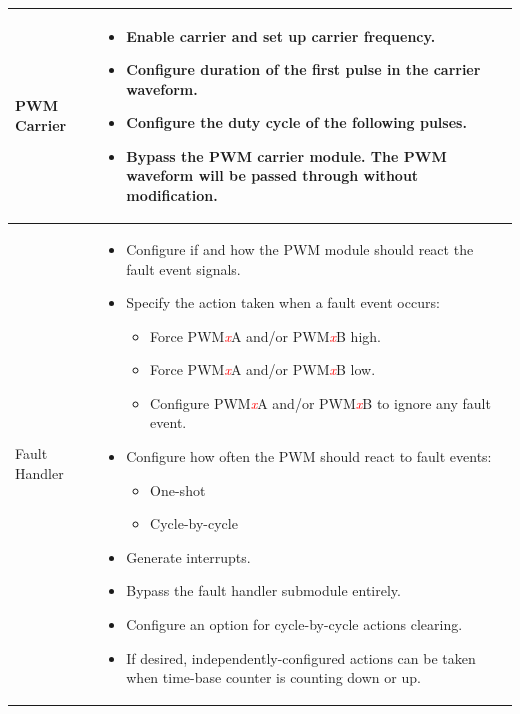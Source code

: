 \begin{longtable}[c]{|m{5cm}|m{10cm}|}
    PWM Carrier &\vspace{-1em}
    \begin{itemize}
        \item Enable carrier and set up carrier frequency.
        \item Configure duration of the first pulse in the carrier waveform.
        \item Configure the duty cycle of the following pulses.
        \item Bypass the PWM carrier module. The PWM waveform will be passed through without modification.\vspace{-1em}
    \end{itemize}\\\hline
    
    Fault Handler &
    \begin{itemize} \vspace{-1em}   
        \item Configure if and how the PWM module should react the fault event signals.
        \item Specify the action taken when a fault event occurs:
        \begin{itemize}
            \item Force PWM\textcolor{red}{\it{x}}A and/or PWM\textcolor{red}{\it{x}}B high.
            \item Force PWM\textcolor{red}{\it{x}}A and/or PWM\textcolor{red}{\it{x}}B low.
            \item Configure PWM\textcolor{red}{\it{x}}A and/or PWM\textcolor{red}{\it{x}}B to ignore any fault event.
        \end{itemize}
        \item Configure how often the PWM should react to fault events:
        \begin{itemize}
            \item One-shot
            \item Cycle-by-cycle
        \end{itemize}
        \item Generate interrupts.
        \item Bypass the fault handler submodule entirely.
        \item Configure an option for cycle-by-cycle actions clearing.
        \item If desired, independently-configured actions can be taken when time-base counter is counting down or up.\vspace{-1em}

    \end{itemize}\\\hline
    
\end{longtable}
